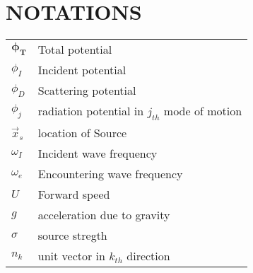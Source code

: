 \chapter*{\centering NOTATIONS}
\vspace{0.5cm}
\begin{table}[h]
\centering
\setlength{\tabcolsep}{12pt}
\renewcommand{\arraystretch}{1.5} %
\begin{tabular}{ll}
    $\boldsymbol{\phi_T}$   &    Total potential \\
    $\phi_I$ & Incident potential \\
    $\phi_D$ & Scattering potential \\
    $\phi_j$ & radiation potential in $j_{th}$ mode of motion \\
    $\vec{x}_s$ & location of Source \\
    $\omega_I$ & Incident wave frequency \\
    $\omega_e$ & Encountering wave frequency \\
    $U$ & Forward speed \\
    $g$ & acceleration due to gravity \\
    $\sigma$ & source stregth \\
    $n_k$ & unit vector in $k_{th}$ direction \\
\end{tabular}
\end{table}